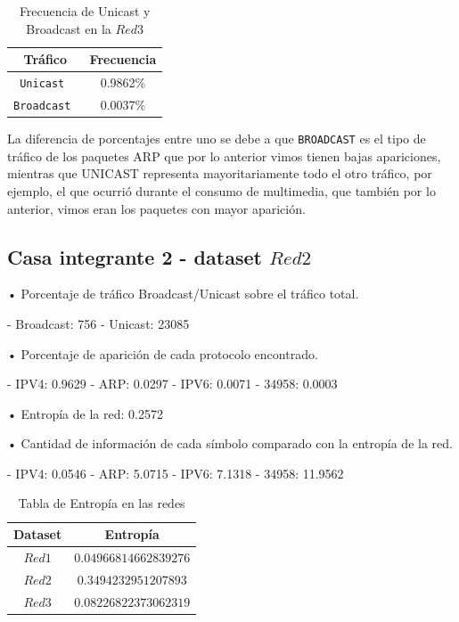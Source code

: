 \begin{table}[H]\begin{center}
  \begin{tabular}{|c|c|}
  \hline
  \textbf{Tráfico} & \textbf{Frecuencia} \\ \hline
  \texttt{Unicast   }&  0.9862\%     \\ \hline
  \texttt{Broadcast      }&  0.0037\%     \\ \hline
  \end{tabular}
  \caption{Frecuencia de Unicast y Broadcast en la $Red 3$}
  \label{Red 3}
\end{center}\end{table}


La diferencia de porcentajes entre uno se debe a que \texttt{BROADCAST} es el tipo de tráfico de los paquetes ARP que por lo anterior vimos tienen bajas apariciones, mientras que UNICAST representa mayoritariamente todo el otro tráfico, por ejemplo, el que ocurrió durante el consumo de multimedia, que también por lo anterior, vimos eran los paquetes con mayor aparición.


\subsection{Casa integrante 2 - dataset $Red 2$}

• Porcentaje de tráfico Broadcast/Unicast sobre el tráfico total.

 - Broadcast: 756
 - Unicast: 23085


• Porcentaje de aparición de cada protocolo encontrado.

 - IPV4: 0.9629
 - ARP: 0.0297
 - IPV6: 0.0071
 - 34958: 0.0003
 
• Entropía de la red: 0.2572

• Cantidad de información de cada símbolo comparado con la entropía de la red.

 - IPV4: 0.0546
 - ARP: 5.0715
 - IPV6: 7.1318
 - 34958: 11.9562

\begin{table}[H]
\begin{center}
    \begin{tabular}{||c c||} 
        \hline
        Dataset & Entropía \\ [0.5ex] 
        \hline\hline
        $Red 1$ & $0.04966814662839276$ \\ 
        \hline
        $Red 2$ & $0.3494232951207893$ \\
        \hline
        $Red 3$ & $0.08226822373062319$ \\ [1ex] 
        \hline
    \end{tabular}
    \caption{Tabla de Entropía en las redes}
    \label{Tabla entropía}
\end{center}
\end{table}


